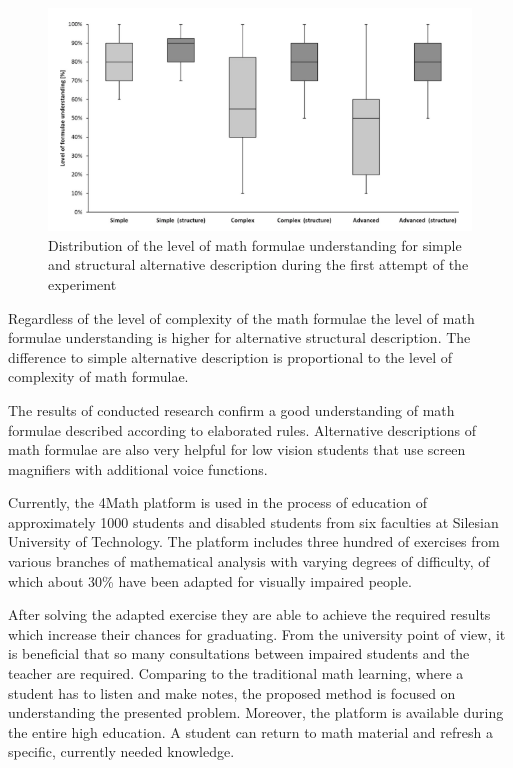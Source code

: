 \documentclass[12pt,1p]{elsarticle}
\begin{document}
\begin{figure}[t]
\centering
\includegraphics[width=5in]{./pics/9}
\caption{Distribution of the level of math formulae understanding for simple and structural alternative description during the first attempt of the experiment}
\label{fig09}
\end{figure}

	Regardless of the level of complexity of the math formulae the level of math formulae understanding is higher for alternative structural description. The difference to simple alternative description is proportional to the level of complexity of math formulae.
	
	The results of conducted research confirm a good understanding of math formulae described according to elaborated rules. Alternative descriptions of math formulae are also very helpful for low vision students that use screen magnifiers with additional voice functions.
	
	Currently, the 4Math platform is used in the process of education of approximately 1000 students and disabled students from six faculties at Silesian University of Technology. The platform includes three hundred of exercises from various branches of mathematical analysis with varying degrees of difficulty, of which about 30\% have been adapted for visually impaired people.
	
	After solving the adapted exercise they are able to achieve the required results which increase their chances for graduating. From the university point of view, it is beneficial that so many consultations between impaired students and the teacher are required. Comparing to the traditional math learning, where a student has to listen and make notes, the proposed method is focused on understanding the presented problem. Moreover, the platform is available during the entire high education. A student can return to math material and refresh a specific, currently needed knowledge.
\end{document}
